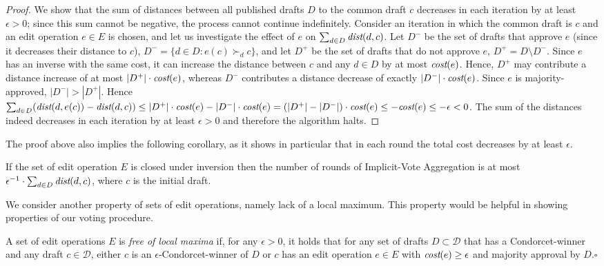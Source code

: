 \documentclass{llncs}
\newcommand{\qqed}{\hfill$\square$}
\newcommand{\calD}{\mathcal{D}}
\newcommand{\prefers}[1]{\succ_{#1}}
\newcommand{\dist}{\emph{dist}}
\newcommand{\cost}{\emph{cost}}
\begin{document}
\begin{proof}
%
We show that the sum of distances between all published drafts $D$ to the common draft $c$ decreases in each iteration by at least $\epsilon >0$; since this sum cannot be negative, the process cannot continue indefinitely. Consider an iteration in which the common draft is $c$ and an edit operation $e \in E$ is chosen, and let us investigate the effect of $e$ on $\sum_{d \in D} \dist(d, c)$.   Let $D^-$ be the  set of drafts that approve $e$ (since it decreases their distance to $c$), $D^- = \{d \in D: e(c) \prefers{d} c\}$,  and let $D^+$ be the set of drafts that do not approve $e$, $D^+ = D \setminus D^-$.  Since $e$ has an inverse with the same cost, it can increase the distance between $c$ and any $d \in D$ by at most $\cost(e)$.
Hence,  $D^+$ may contribute a distance increase of at most $|D^+| \cdot \cost(e)$, whereas  $D^-$  contributes a distance decrease of exactly $|D^-| \cdot \cost(e)$. 
Since $e$ is majority-approved, $|D^-| > |D^+|$.   Hence  $\sum_{d \in D} (\dist(d, e(c)) -\dist(d,c)) \le |D^+| \cdot \cost(e) -  |D^-| \cdot \cost(e)  = (|D^+| - |D^-|) \cdot \cost(e) \le  -\cost(e) \le - \epsilon < 0$.  The sum of the distances indeed decreases in each iteration by at least $\epsilon >0$ and therefore the algorithm halts.
%
\end{proof}

The proof above also implies the following corollary, as it shows in particular that in each round the total cost decreases by at least $\epsilon$.

\begin{corollary}
  If the set of edit operation $E$ is closed under inversion then the number of rounds of Implicit-Vote Aggregation is at most $\epsilon^{-1} \cdot \sum_{d \in D} \dist(d, c)$, where $c$ is the initial draft. 
\end{corollary}

We consider another property of sets of edit operations, namely lack of a local maximum. This property would be helpful in showing properties of our voting procedure.

\begin{definition}
%
A set of edit operations $E$ is \emph{free of local maxima} if, for any $\epsilon > 0$, it holds that for any set of drafts $D \subset \calD$ that has a Condorcet-winner and any draft $c \in \calD$, either $c$ is an $\epsilon$-Condorcet-winner of $D$ or $c$ has an edit operation $e \in E$ with $\cost(e) \ge \epsilon$ and majority approval by $D$.\qqed
%
\end{definition}
\end{document}
